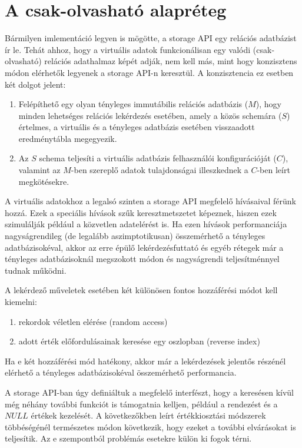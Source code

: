 \documentclass[
    parspace, %
    noindent, %
]{elteiktdk}[2023/10/30]
\begin{document}

\section{A csak-olvasható alapréteg}

Bármilyen imlementáció legyen is mögötte, a storage API egy relációs adatbázist ír le.
Tehát ahhoz, hogy a virtuális adatok funkcionálisan egy valódi (csak-olvasható) relációs adathalmaz képét adják,
nem kell más, mint hogy konzisztens módon elérhetők legyenek a storage API-n keresztül.
A konzisztencia ez esetben két dolgot jelent:

\begin{enumerate}
  \item Felépíthető egy olyan tényleges immutábilis relációs adatbázis ($M$),
        hogy minden lehetséges relációs lekérdezés esetében, amely a közös schemára ($S$) értelmes,
        a virtuális és a tényleges adatbázis esetében visszaadott eredménytábla megegyezik.
  \item Az $S$ schema teljesíti a virtuális adatbázis felhasználói konfigurációját ($C$),
        valamint az $M$-ben szereplő adatok tulajdonságai illeszkednek a $C$-ben leírt megkötésekre.
\end{enumerate}

A virtuális adatokhoz a legalsó szinten a storage API megfelelő hívásaival férünk hozzá.
Ezek a speciális hívások szűk keresztmetszetet képeznek,
hiszen ezek szimulálják például a közvetlen adatelérést is.
Ha ezen hívások performanciája nagyságrendileg (de legalább aszimptotikusan) összemérhető a tényleges adatbázisokéval,
akkor az erre épülő lekérdezésfuttató és egyéb rétegek már
a tényleges adatbázisoknál megszokott módon és nagyságrendi teljesítménnyel tudnak működni.

A lekérdező műveletek esetében két különösen fontos hozzáférési módot kell kiemelni:

\begin{enumerate}
  \item rekordok véletlen elérése (random access)
  \item adott érték előfordulásainak keresése egy oszlopban (reverse index)
\end{enumerate}

Ha e két hozzáférési mód hatékony, akkor már a lekérdezések jelentős részénél
elérhető a tényleges adatbázisokéval összemérhető performancia.

A storage API-ban úgy definiáltuk a megfelelő interfészt,
hogy a keresésen kívül még néhány további funkciót is támogatnia kelljen,
például a rendezést és a $NULL$ értékek kezelését.
A következőkben leírt értékkiosztási módszerek többéségénél természetes módon következik,
hogy ezeket a további elvárásokat is teljesítik.
Az e szempontból problémás esetekre külön ki fogok térni.
\end{document}
